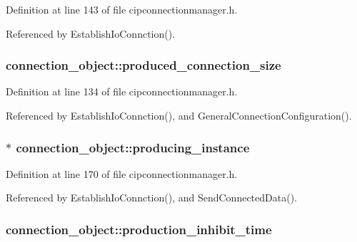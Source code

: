 \-Definition at line 143 of file cipconnectionmanager.\-h.



\-Referenced by \-Establish\-Io\-Connction().

\hypertarget{structconnection__object_a06f2c634d47a6b2883821737aff5ec03}{
\subsubsection[{produced\-\_\-connection\-\_\-size}]{ {\bf connection\-\_\-object\-::produced\-\_\-connection\-\_\-size}}}\label{d1/d48/structconnection__object_a06f2c634d47a6b2883821737aff5ec03}


\-Definition at line 134 of file cipconnectionmanager.\-h.



\-Referenced by \-Establish\-Io\-Connction(), and \-General\-Connection\-Configuration().

\hypertarget{structconnection__object_ab486fb828cb85f57c53abea69ad9faff}{
\subsubsection[{producing\-\_\-instance}]{$\ast$ {\bf connection\-\_\-object\-::producing\-\_\-instance}}}\label{d1/d48/structconnection__object_ab486fb828cb85f57c53abea69ad9faff}


\-Definition at line 170 of file cipconnectionmanager.\-h.



\-Referenced by \-Establish\-Io\-Connction(), and \-Send\-Connected\-Data().

\hypertarget{structconnection__object_ad0ebc379aa4dc0d0c8d26ef8e3d7f3a8}{
\subsubsection[{production\-\_\-inhibit\-\_\-time}]{ {\bf connection\-\_\-object\-::production\-\_\-inhibit\-\_\-time}}}\label{d1/d48/structconnection__object_ad0ebc379aa4dc0d0c8d26ef8e3d7f3a8}


